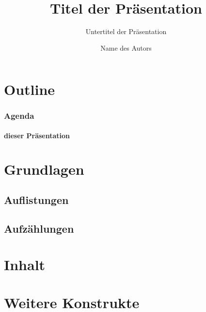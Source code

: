 \documentclass[t]{beamer}
\author{Name des Autors}
\title{Titel der Pr\"asentation}
\subtitle{Untertitel der Pr\"asentation}
\begin{document}
    

    \section*{Outline}
    \begin{frame}
        \frametitle{Agenda}
        \framesubtitle{dieser Pr\"asentation}
        \tableofcontents
    \end{frame}

    \section{Grundlagen}


    \subsection{Auflistungen}

    

    \subsection{Aufz\"ahlungen}

    

    \section{Inhalt}

    

    \section{Weitere Konstrukte}

    

    

    
\end{document}
